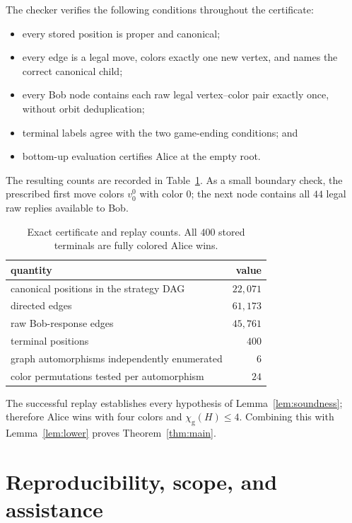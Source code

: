 \documentclass[11pt]{article}
\newcommand{\chig}{\chi_{\mathrm g}}
\begin{document}
The checker verifies the following conditions throughout the certificate:
\begin{itemize}
  \item every stored position is proper and canonical;
  \item every edge is a legal move, colors exactly one new vertex, and names
        the correct canonical child;
  \item every Bob node contains each raw legal vertex--color pair exactly
        once, without orbit deduplication;
  \item terminal labels agree with the two game-ending conditions; and
  \item bottom-up evaluation certifies Alice at the empty root.
\end{itemize}
The resulting counts are recorded in Table~\ref{tab:certificate}.  As a small
boundary check, the prescribed first move colors $v_0^0$ with color $0$; the
next node contains all $44$ legal raw replies available to Bob.

\begin{table}[ht]
\centering
\begin{tabular}{lr}
\toprule
quantity & value\\
\midrule
canonical positions in the strategy DAG & $22{,}071$\\
directed edges & $61{,}173$\\
raw Bob-response edges & $45{,}761$\\
terminal positions & $400$\\
graph automorphisms independently enumerated & $6$\\
color permutations tested per automorphism & $24$\\
\bottomrule
\end{tabular}
\caption{Exact certificate and replay counts.  All $400$ stored terminals are
fully colored Alice wins.}
\label{tab:certificate}
\end{table}

The successful replay establishes every hypothesis of
Lemma~\ref{lem:soundness}; therefore Alice wins with four colors and
$\chig(H)\leq4$.  Combining this with Lemma~\ref{lem:lower} proves
Theorem~\ref{thm:main}.

\section{Reproducibility, scope, and assistance}
\end{document}
